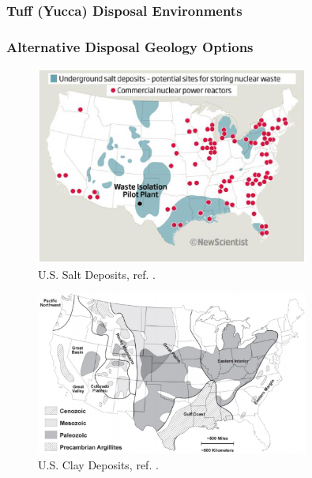 

\begin{frame}[ctb!]
  \frametitle{Tuff (Yucca) Disposal Environments}
  \footnotesize{
    
  }
\end{frame}

\begin{frame}[ctb!]
  \frametitle{Alternative Disposal Geology Options}
   \begin{minipage}{0.44\textwidth}
     \begin{figure}[h!]
         \includegraphics[width=0.8\textwidth]{./images/saltNewScientist.eps}
         \caption{U.S. Salt Deposits, ref. \cite{newscientist_where_2011}.}
     \end{figure}
     \begin{figure}[h!]
         \includegraphics[width=0.8\textwidth]{./images/clayGonzales.eps}
         \caption{U.S. Clay Deposits, ref. \cite{gonzales_shales_1985}.}
     \end{figure}
   \end{minipage}
   \hspace{0.01cm}
   \begin{minipage}{0.44\textwidth}
     \begin{figure}[h!]

\end{figure}
\end{minipage}
\end{frame}
